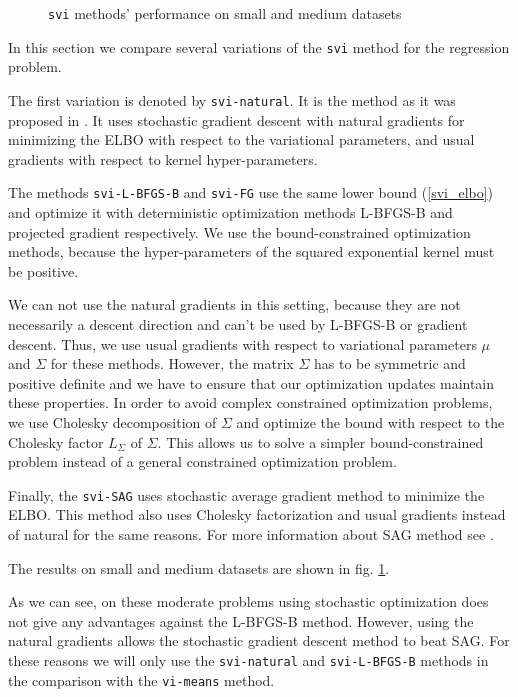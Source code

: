 \begin{figure}[t!]
	\centering

	\subfloat{
		\scalebox{0.75}{
			
		}
	}
	\subfloat{
		\scalebox{0.75}{
    		
		}
	}
	\vspace{0.1cm}
	\subfloat{
		\scalebox{0.75}{
			
		}
	}
	\subfloat{
		\scalebox{0.75}{
    		
		}
	}
	\caption{\lstinline{svi} methods' performance on small and medium datasets}
	\label{svi_results}
\end{figure}
In this section we compare several variations of the \lstinline{svi} method for the regression problem.

The first variation is denoted by \lstinline{svi-natural}. It is the method as it was proposed in \cite{BigData}. It uses stochastic gradient descent with natural gradients for minimizing the ELBO with respect to the variational parameters, and usual gradients with respect to kernel hyper-parameters.

The methods \lstinline{svi-L-BFGS-B} and \lstinline{svi-FG} use the same lower bound (\ref{svi_elbo}) and optimize it with deterministic optimization methods L-BFGS-B and projected gradient respectively. We use the bound-constrained optimization methods, because the hyper-parameters of the squared exponential kernel must be positive.

We can not use the natural gradients in this setting, because they are not necessarily a descent direction and can't be used by L-BFGS-B or gradient descent. Thus, we use usual gradients with respect to variational parameters $\mu$ and $\Sigma$ for these methods. However, the matrix $\Sigma$ has to be symmetric and positive definite and we have to ensure that our optimization updates maintain these properties. In order to avoid complex constrained optimization problems, we use Cholesky decomposition of $\Sigma$ and optimize the bound with respect to the Cholesky factor $L_\Sigma$ of $\Sigma$. This allows us to solve a simpler bound-constrained problem instead of a general constrained optimization problem.

Finally, the \lstinline{svi-SAG} uses stochastic average gradient method to minimize the ELBO. This method also uses Cholesky factorization and usual gradients instead of natural for the same reasons. For more information about SAG method see \cite{SAG}.


The results on small and medium datasets are shown in fig. \ref{svi_results}.

As we can see, on these moderate problems using stochastic optimization does not give any advantages against the L-BFGS-B method. However, using the natural gradients allows the stochastic gradient descent method to beat SAG. For these reasons we will only use the \lstinline{svi-natural} and \lstinline{svi-L-BFGS-B} methods in the comparison with the \lstinline{vi-means} method.